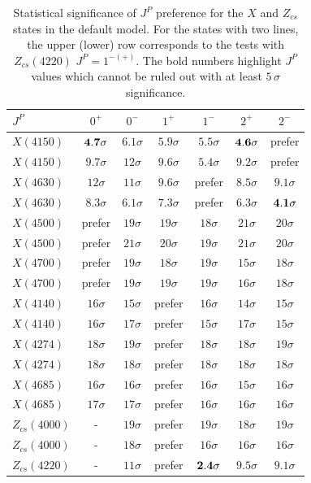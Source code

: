 \begin{table}[hbtp]
\centering
\caption{Statistical significance of $J^P$ preference for the $X$ and $Z_{cs}$ states in the default model. 
For the states with two lines, the upper (lower) row corresponds to the tests with $Z_{cs}(4220)$ $J^P=1^{-(+)}$. 
The bold numbers highlight $J^P$ values which cannot be ruled out with at least $5\,\sigma$ significance.}\label{tab:jp}
\begin{tabular}{lcccccc}\hline
$J^P$ & $0^{+}$& $0^{-}$ & $1^{+}$ & $1^{-}$ & $2^{+}$& $2^{-}$ \\ \hline
  $ X(4150) $ &$   \bf 4.7 \sigma$ &$   6.1 \sigma$ &$   5.9 \sigma$ &$   5.5 \sigma$ &$   \bf 4.6 \sigma$ &prefer\\
   $ X(4150) $ &$   9.7 \sigma$ &$  12 \sigma$ &$   9.6 \sigma$ &$   5.4 \sigma$ &$   9.2 \sigma$ &prefer\\
\hline
 $ X(4630) $ &$  12 \sigma$ &$  11 \sigma$ &$   9.6 \sigma$ &prefer&$   8.5 \sigma$ &$   9.1 \sigma$ \\
  $ X(4630) $ &$   8.3 \sigma$ &$   6.1 \sigma$ &$   7.3 \sigma$ &prefer&$   6.3 \sigma$ &$   \bf 4.1 \sigma$ \\
\hline
 $ X(4500) $ &prefer&$  19 \sigma$ &$  19 \sigma$ &$  18 \sigma$ &$  21 \sigma$ &$  20 \sigma$ \\
  $ X(4500) $ &prefer&$  21 \sigma$ &$  20 \sigma$ &$  19 \sigma$ &$  21 \sigma$ &$  20 \sigma$ \\
\hline
 $ X(4700) $ &prefer&$  19 \sigma$ &$  18 \sigma$ &$  19 \sigma$ &$   15 \sigma$ &$  18 \sigma$ \\
  $ X(4700) $ &prefer&$  19 \sigma$ &$  19 \sigma$ &$  19 \sigma$ &$  16 \sigma$ &$  18 \sigma$ \\
\hline
 $ X(4140) $ &$  16 \sigma$ &$  15 \sigma$ &prefer&$  16 \sigma$ &$  14 \sigma$ &$  15 \sigma$ \\
  $ X(4140) $ &$  16 \sigma$ &$  17 \sigma$ &prefer&$  15 \sigma$ &$  17 \sigma$ &$  15 \sigma$ \\
\hline
 $ X(4274) $ &$  18 \sigma$ &$  19 \sigma$ &prefer&$  18 \sigma$ &$  18 \sigma$ &$  19 \sigma$ \\
  $ X(4274) $ &$  18 \sigma$ &$  18 \sigma$ &prefer&$  18 \sigma$ &$  18 \sigma$ &$  18 \sigma$ \\
\hline
 $ X(4685) $ &$  16 \sigma$ &$  16 \sigma$ &prefer&$  16 \sigma$ &$  15 \sigma$ &$  16 \sigma$ \\
  $ X(4685) $ &$  17 \sigma$ &$  17 \sigma$ &prefer&$  16 \sigma$ &$  16 \sigma$ &$  16 \sigma$ \\
\hline
 $ Z_{cs}(4000) $ &- &$  19 \sigma$ &prefer&$  19 \sigma$ &$  18 \sigma$ &$  19 \sigma$ \\
 $ Z_{cs}(4000) $ &- &$  18 \sigma$ &prefer&$  16 \sigma$ &$  16 \sigma$ &$  16 \sigma$ \\
 \hline
 $ Z_{cs}(4220) $ &- &$  11 \sigma$ &prefer&$   \bf 2.4 \sigma$ &$   9.5 \sigma$ &$   9.1 \sigma$ \\\hline
\hline
\end{tabular}
\end{table}


